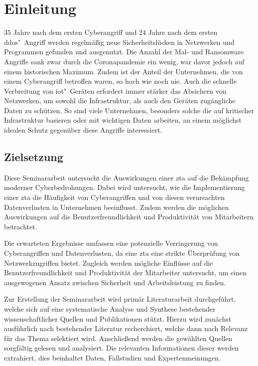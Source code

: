 \section{Einleitung}\label{sec:einleitung}

$35$ Jahre nach dem ersten Cyberangriff und $24$ Jahre nach dem ersten \ac{ddos}"~Angriff werden regelmäßig neue Sicherheitslücken in Netzwerken und Programmen gefunden und ausgenutzt.
Die Anzahl der Mal- und Ransomware Angriffe sank zwar durch die Coronapandemie ein wenig, war davor jedoch auf einem historischen Maximum.
Zudem ist der Anteil der Unternehmen, die von einem Cyberangriff betroffen waren, so hoch wie noch nie.
Auch die schnelle Verbreitung von \ac{iot}"~Geräten erfordert immer stärker das Absichern von Netzwerken, um sowohl die Infrastruktur, als auch den Geräten zugängliche Daten zu schützen.
So sind viele Unternehmen, besonders solche die auf kritischer Infrastruktur basieren oder mit wichtigen Daten arbeiten, an einem möglichst idealen Schutz gegenüber diese Angriffe interessiert.

\subsection{Zielsetzung}\label{subsec:zielsetzung}
Diese Seminararbeit untersucht die Auswirkungen einer \ac{zta} auf die Bekämpfung moderner Cyberbedrohungen.
Dabei wird untersucht, wie die Implementierung einer \ac{zta} die Häufigkeit von Cyberangriffen und von diesen verursachten Datenverlusten in Unternehmen beeinflusst.
Zudem werden die möglichen Auswirkungen auf die Benutzerfreundlichkeit und Produktivität von Mitarbeitern betrachtet.

Die erwarteten Ergebnisse umfassen eine potenzielle Verringerung von Cyberangriffen und Datenverlusten, da eine \ac{zta} eine strikte Überprüfung von Netzwerkzugriffen bietet.
Zugleich werden mögliche Einflüsse auf die Benutzerfreundlichkeit und Produktivität der Mitarbeiter untersucht, um einen ausgewogenen Ansatz zwischen Sicherheit und Arbeitsleistung zu finden.

Zur Erstellung der Seminararbeit wird primär Literaturarbeit durchgeführt, welche sich auf eine systematische Analyse und Synthese bestehender wissenschaftlicher Quellen und Publikationen stützt.
Hierzu wird zunächst ausführlich nach bestehender Literatur recherchiert, welche dann nach Relevanz für das Thema selektiert wird.
Anschließend werden die gewählten Quellen sorgfältig gelesen und analysiert.
Die relevanten Informationen dieser werden extrahiert, dies beinhaltet Daten, Fallstudien und Expertenmeinungen.

